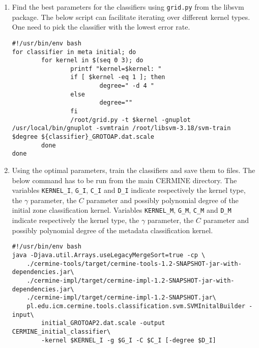 \begin{appendix}
\begin{enumerate}
\item Find the best parameters for the classifiers using \verb+grid.py+ from the libsvm package. The below script can facilitate iterating over different kernel types. One need to pick the classifier with the lowest error rate.
\begin{lstlisting}
#!/usr/bin/env bash
for classifier in meta initial; do
        for kernel in $(seq 0 3); do
                printf "kernel=$kernel: "
                if [ $kernel -eq 1 ]; then
                        degree=" -d 4 "
                else
                        degree=""
                fi
                /root/grid.py -t $kernel -gnuplot /usr/local/bin/gnuplot -svmtrain /root/libsvm-3.18/svm-train $degree ${classifier}_GROTOAP.dat.scale
        done
done
\end{lstlisting}
\item Using the optimal parameters, train the classifiers and save them to files. The below command has to be run from the main CERMINE directory. The variables \verb+KERNEL_I+, \verb+G_I+, \verb+C_I+ and \verb+D_I+ indicate respectively the kernel type, the $\gamma$ parameter, the $C$ parameter and possibly polynomial degree of the initial zone classification kernel. Variables \verb+KERNEL_M+, \verb+G_M+, \verb+C_M+ and \verb+D_M+ indicate respectively the kernel type, the $\gamma$ parameter, the $C$ parameter and possibly polynomial degree of the metadata classification kernel.
\begin{lstlisting}
#!/usr/bin/env bash
java -Djava.util.Arrays.useLegacyMergeSort=true -cp \
    ./cermine-tools/target/cermine-tools-1.2-SNAPSHOT-jar-with-dependencies.jar\
    ./cermine-impl/target/cermine-impl-1.2-SNAPSHOT-jar-with-dependencies.jar\
    ./cermine-impl/target/cermine-impl-1.2-SNAPSHOT.jar\
    pl.edu.icm.cermine.tools.classification.svm.SVMInitalBuilder -input\
        initial_GROTOAP2.dat.scale -output CERMINE_initial_classifier\
        -kernel $KERNEL_I -g $G_I -C $C_I [-degree $D_I]


\end{lstlisting}
\end{enumerate}
\end{appendix}
